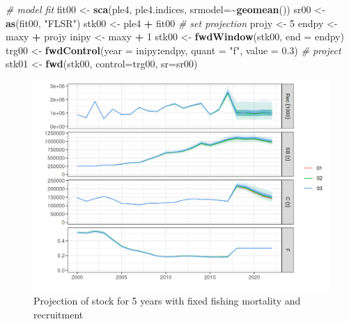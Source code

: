 \documentclass[
]{book}
\newenvironment{Shaded}{\begin{snugshade}}{\end{snugshade}}
\newcommand{\AttributeTok}[1]{\textcolor[rgb]{0.13,0.29,0.53}{#1}}
\newcommand{\CommentTok}[1]{\textcolor[rgb]{0.56,0.35,0.01}{\textit{#1}}}
\newcommand{\DecValTok}[1]{\textcolor[rgb]{0.00,0.00,0.81}{#1}}
\newcommand{\FloatTok}[1]{\textcolor[rgb]{0.00,0.00,0.81}{#1}}
\newcommand{\FunctionTok}[1]{\textcolor[rgb]{0.13,0.29,0.53}{\textbf{#1}}}
\newcommand{\NormalTok}[1]{#1}
\newcommand{\OtherTok}[1]{\textcolor[rgb]{0.56,0.35,0.01}{#1}}
\newcommand{\SpecialCharTok}[1]{\textcolor[rgb]{0.81,0.36,0.00}{\textbf{#1}}}
\newcommand{\StringTok}[1]{\textcolor[rgb]{0.31,0.60,0.02}{#1}}
\begin{document}
\begin{Shaded}
\begin{Highlighting}[]
\CommentTok{\# model fit}
\NormalTok{fit00 }\OtherTok{\textless{}{-}} \FunctionTok{sca}\NormalTok{(ple4, ple4.indices, }\AttributeTok{srmodel=}\SpecialCharTok{\textasciitilde{}}\FunctionTok{geomean}\NormalTok{()) }
\NormalTok{sr00 }\OtherTok{\textless{}{-}} \FunctionTok{as}\NormalTok{(fit00, }\StringTok{"FLSR"}\NormalTok{)}
\NormalTok{stk00 }\OtherTok{\textless{}{-}}\NormalTok{ ple4 }\SpecialCharTok{+}\NormalTok{ fit00}
\CommentTok{\# set projection}
\NormalTok{projy }\OtherTok{\textless{}{-}} \DecValTok{5}
\NormalTok{endpy }\OtherTok{\textless{}{-}}\NormalTok{ maxy }\SpecialCharTok{+}\NormalTok{ projy}
\NormalTok{inipy }\OtherTok{\textless{}{-}}\NormalTok{ maxy }\SpecialCharTok{+} \DecValTok{1}
\NormalTok{stk00 }\OtherTok{\textless{}{-}} \FunctionTok{fwdWindow}\NormalTok{(stk00, }\AttributeTok{end =}\NormalTok{ endpy)}
\NormalTok{trg00 }\OtherTok{\textless{}{-}} \FunctionTok{fwdControl}\NormalTok{(}\AttributeTok{year =}\NormalTok{ inipy}\SpecialCharTok{:}\NormalTok{endpy, }\AttributeTok{quant =} \StringTok{"f"}\NormalTok{, }\AttributeTok{value =} \FloatTok{0.3}\NormalTok{)}
\CommentTok{\# project}
\NormalTok{stk01 }\OtherTok{\textless{}{-}} \FunctionTok{fwd}\NormalTok{(stk00, }\AttributeTok{control=}\NormalTok{trg00, }\AttributeTok{sr=}\NormalTok{sr00)}
\end{Highlighting}
\end{Shaded}

\begin{figure}
\centering
\includegraphics{_bookdown_files/_main_files/figure-html/unnamed-chunk-97-1.png}
\caption{\label{fig:unnamed-chunk-97}Projection of stock for 5 years with fixed fishing mortality and recruitment}
\end{figure}
\end{document}
